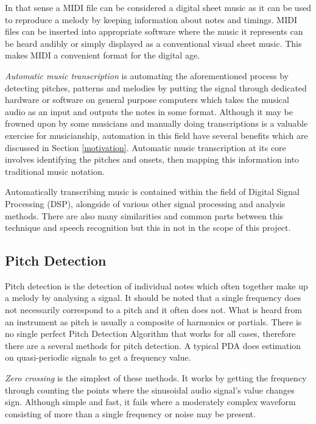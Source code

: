 \documentclass[a4paper,12pt]{report}
\begin{document}
In that sense a MIDI file can be considered a digital sheet music as it can be used to reproduce a melody by keeping information about notes and timings. MIDI files can be inserted into appropriate software where the music it represents can be heard audibly or simply displayed as a conventional visual sheet music. This makes MIDI a convenient format for the digital age.

\textit{Automatic music transcription} is automating the aforementioned process by detecting pitches, patterns and melodies by putting the signal through dedicated hardware or software on general purpose computers which takes the musical audio as an input and outputs the notes in some format. Although it may be frowned upon by some musicians and manually doing transcriptions is a valuable exercise for musicianship, automation in this field have several benefits which are discussed in Section \ref{motivation}. Automatic music transcription at its core involves identifying the pitches and onsets, then mapping this information into traditional music notation. 

Automatically transcribing music is contained within the field of Digital Signal Processing (DSP), alongside of various other signal processing and analysis methods. There are also many similarities and common parts between this technique and speech recognition but this in not in the scope of this project.

\subsection{Pitch Detection}
Pitch detection is the detection of individual notes which often together make up a melody by analysing a signal. It should be noted that a single frequency does not necessarily correspond to a pitch and it often does not. What is heard from an instrument as pitch is usually a composite of harmonics or partials. There is no single perfect Pitch Detection Algorithm that works for all cases, therefore there are a several methods \cite{paper:5} for pitch detection. A typical PDA does estimation on quasi-periodic signals to get a frequency value.  

\textit{Zero crossing} is the simplest of these methods. It works by getting the frequency through counting the points where the sinusoidal audio signal's value changes sign. Although simple and fast, it fails where a moderately complex waveform consisting of more than a single frequency or noise may be present.
\end{document}
